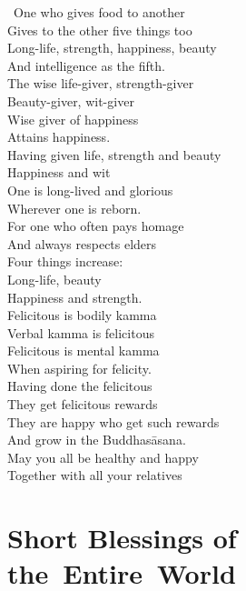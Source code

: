 \begin{english-verses}
  \anglebracketleft\ \hspace{-0.5mm}One who gives food to another \hspace{-0.5mm}\anglebracketright\ \\
  Gives to the other five things too\\
  Long-life, strength, happiness, beauty\\
  And intelligence as the fifth.\\
  The wise life-giver, strength-giver\\
  Beauty-giver, wit-giver\\
  Wise giver of happiness\\
  Attains happiness.\\
  Having given life, strength and beauty\\
  Happiness and wit\\
  One is long-lived and glorious\\
  Wherever one is reborn.\\
  For one who often pays homage\\
  And always respects elders\\
  Four things increase:\\
  Long-life, beauty\\
  Happiness and strength.\\
  Felicitous is bodily kamma\\
  Verbal kamma is felicitous\\
  Felicitous is mental kamma\\
  When aspiring for felicity.\\
  Having done the felicitous\\
  They get felicitous rewards\\
  They are happy who get such rewards\\
  And grow in the Buddhasāsana.\\
  May you all be healthy and happy\\
  Together with all your relatives
\end{english-verses}

\suttaRef{[AN 5.37 / Dhp 109 / AN 3.155]}

\clearpage



\section{Short Blessings of \mbox{the}~Entire~World}
\label{blessings-of-entire-world}

